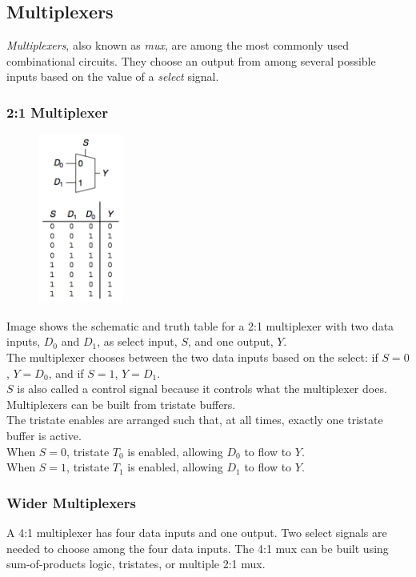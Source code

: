 \documentclass[12pt]{article}
\theoremstyle{definition}
\begin{document}
  \subsection{Multiplexers}
  \emph{Multiplexers}, also known as \emph{mux}, are among the most commonly used combinational circuits.
  They choose an output from among several possible inputs based on the value of a \emph{select} signal.

  \subsubsection{2:1 Multiplexer}
  \begin{figure}
    \includegraphics[width=0.25\textwidth]{pictures/2_1_mux.png}
  \end{figure}
  Image shows the schematic and truth table for a 2:1 multiplexer with two data inputs, $D_0$ and $D_1$, as select input, $S$, and one output, $Y$. \\
  The multiplexer chooses between the two data inputs based on the select:
  if $S = 0$, $Y = D_0$, and if $S = 1$, $Y = D_1$.  \\
  $S$ is also called a control signal because it controls what the multiplexer does. \\

  Multiplexers can be built from tristate buffers. \\
  The tristate enables are arranged such that, at all times, exactly one tristate buffer is active. \\
  When $S = 0$, tristate $T_0$ is enabled, allowing $D_0$ to flow to $Y$. \\
  When $S = 1$, tristate $T_1$ is enabled, allowing $D_1$ to flow to $Y$.

  \subsubsection{Wider Multiplexers}
  A 4:1 multiplexer has four data inputs and one output.
  Two select signals are needed to choose among the four data inputs.
  The 4:1 mux can be built using sum-of-products logic, tristates, or multiple 2:1 mux. \\
\end{document}
